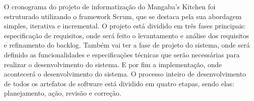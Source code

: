 \hspace{4.5mm}
O cronograma do projeto de informatização do Mangaba's Kitchen foi estruturado utilizando o framework Scrum, que se destaca pela sua abordagem simples, iterativa e incremental. O projeto está dividido em três fases principais: especificação de requisitos, onde será feito o levantamento e análise dos requisitos e refinamento do backlog. Também vai ter a fase de projeto do sistema, onde será definido as funcionalidades e especificações técnicas que serão necessárias para realizar o desenvolvimento do sistema. E por fim a implementação, onde acontecerá o desenvolvimento do sistema. O processo inteiro de desenvolvimento de todos os artefatos de software está dividido em quatro etapas, sendo elas: planejamento, ação, revisão e correção.